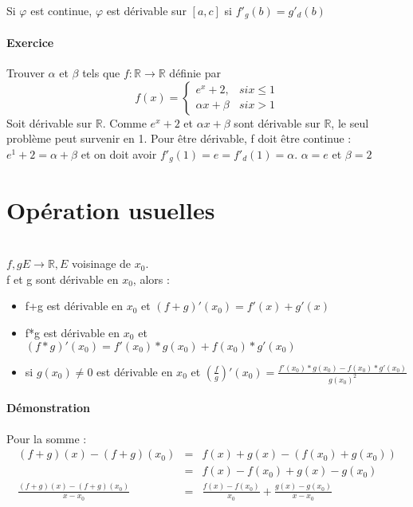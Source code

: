 		Si $\varphi$ est continue, $\varphi$ est dérivable sur $[a, c]$ si $f'_g(b) = g'_d(b)$

		\paragraph{Exercice} Trouver $\alpha$ et $\beta$ tels que $f:\mathbb{R} \rightarrow \mathbb{R}$ définie par 
		\[f(x) = 
			\left\{
				\begin{array}{rl}
					e^x +2, & si x \leq 1 \\
					\alpha x + \beta & si x > 1
				\end{array}
				\right.
			\]
			Soit dérivable sur $\mathbb{R}$. Comme $e^x +2$ et $\alpha x + \beta$ sont dérivable sur $\mathbb{R}$, le seul problème peut survenir en 1.
			Pour être dérivable, f doit être continue :
			$e^1 + 2 = \alpha + \beta$ et on doit avoir $f'_g(1) = e = f'_d(1) = \alpha$. $\alpha = e$ et $\beta = 2$

			\section{Opération usuelles} ~\\
			$f, g E \rightarrow \mathbb{R}, E$ voisinage de $x_0$.
			~\\
			f et g sont dérivable en $x_0$, alors :
			\begin{itemize}
				\item f+g est dérivable en $x_0$ et $(f+g)'(x_0) = f'(x)+g'(x)$
				\item f*g est dérivable en $x_0$ et $(f*g)'(x_0) = f'(x_0)*g(x_0)+f(x_0)*g'(x_0)$
				\item si $g(x_0) \neq 0$  est dérivable en $x_0$ et $(\frac{f}{g})'(x_0) = \frac{f'(x_0)*g(x_0)-f(x_0)*g'(x_0)}{g(x_0)^2}$
			\end{itemize}

			\paragraph{Démonstration} 
			Pour la somme : 
			\[\begin{array}{rcl}
				(f+g)(x) - (f+g)(x_0) &=& f(x)+g(x) - (f(x_0)+g(x_0)) \\
																							   &=& f(x) - f(x_0) + g(x) - g(x_0) \\
				\frac{(f+g)(x)-(f+g)(x_0)}{x-x_0} &=& \frac{f(x) - f(x_0)}{x_0} + \frac{g(x) - g(x_0)}{x-x_0}
		\end{array}\]

